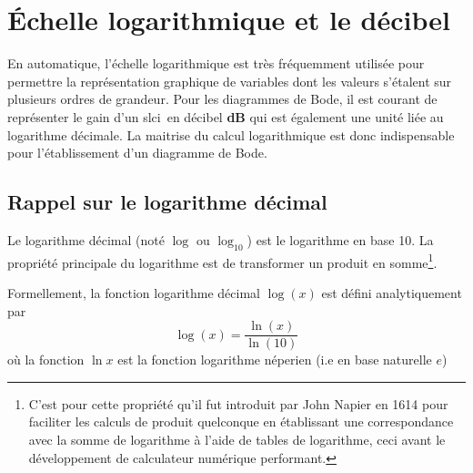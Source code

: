 \chapter{\'Echelle logarithmique et le décibel~\label{annexe-log}}
En automatique, l'échelle logarithmique est très fréquemment 
utilisée pour permettre la représentation
graphique de variables dont les valeurs s'étalent sur plusieurs ordres 
de grandeur. Pour les diagrammes de Bode, il est courant de représenter le gain 
d'un \gls{slci}~en décibel \textbf{dB} qui est également une unité liée au 
logarithme décimale. La maitrise du calcul logarithmique est donc indispensable
pour l'établissement d'un diagramme de Bode.
\section{Rappel sur le logarithme décimal}
Le logarithme décimal (noté $\log$ ou $\log_{10}$) est le logarithme en base 10.
La propriété principale du logarithme est de transformer un produit en 
somme\footnote{C'est pour cette propriété qu'il fut introduit par John Napier 
en 1614 pour faciliter les calculs de produit quelconque en établissant une 
correspondance avec la somme de logarithme à l'aide de tables de logarithme, 
ceci avant le développement de calculateur numérique performant.}.

Formellement, la fonction logarithme décimal $\log{(x)}$ est défini 
analytiquement par 
\[
\log{(x)}=\dfrac{\ln{(x)}}{\ln{(10)}}
\]
où la fonction $\ln{x}$ est la fonction logarithme néperien (i.e en base 
naturelle $e$) 
